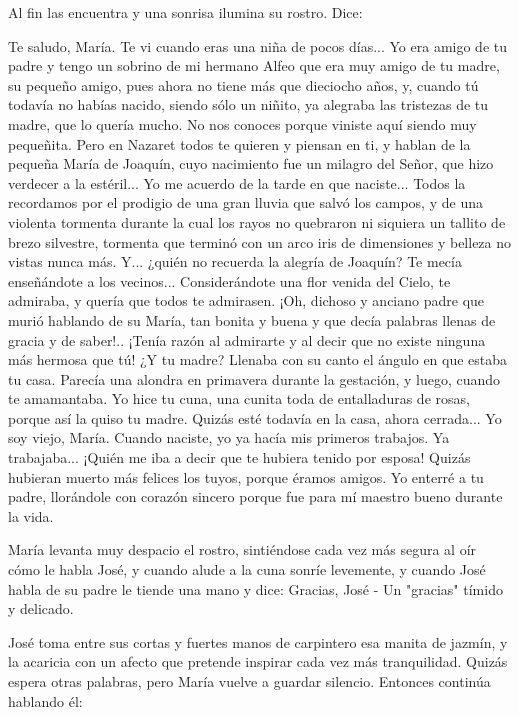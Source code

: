 \documentclass[12pt, twoside, openright]{book} %
\begin{document}
Al fin las encuentra y una sonrisa ilumina su rostro. Dice: 

Te saludo, María. Te vi cuando eras una niña de pocos días... Yo era amigo de tu padre y tengo un sobrino de mi hermano Alfeo que era muy amigo de tu madre, su pequeño amigo, pues ahora no tiene más que dieciocho años, y, cuando tú todavía no habías nacido, siendo sólo un niñito, ya alegraba las tristezas de tu madre, que lo quería mucho. No nos conoces porque viniste aquí siendo muy pequeñita. Pero en Nazaret todos te quieren y piensan en ti, y hablan de la pequeña María de Joaquín, cuyo nacimiento fue un milagro del Señor, que hizo verdecer a la estéril... Yo me acuerdo de la tarde en que naciste... Todos la recordamos por el prodigio de una gran lluvia que salvó los campos, y de una violenta tormenta durante la cual los rayos no quebraron ni siquiera un tallito de brezo silvestre, tormenta que terminó con un arco iris de dimensiones y belleza no vistas nunca más. Y... ¿quién no recuerda la alegría de Joaquín? Te mecía enseñándote a los vecinos... Considerándote una flor venida del Cielo, te admiraba, y quería que todos te admirasen. ¡Oh, dichoso y anciano padre que murió hablando de su María, tan bonita y buena y que decía palabras llenas de gracia y de saber!.. ¡Tenía razón al admirarte y al decir que no existe ninguna más hermosa que tú! ¿Y tu madre? Llenaba con su canto el ángulo en que estaba tu casa. Parecía una alondra en primavera durante la gestación, y luego, cuando te amamantaba. Yo hice tu cuna, una cunita toda de entalladuras de rosas, porque así la quiso tu madre. Quizás esté todavía en la casa, ahora cerrada... Yo soy viejo, María. Cuando naciste, yo ya hacía mis primeros trabajos. Ya trabajaba... ¡Quién me iba a decir que te hubiera tenido por esposa! Quizás hubieran muerto más felices los tuyos, porque éramos amigos. Yo enterré a tu padre, llorándole con corazón sincero porque fue para mí maestro bueno durante la vida. 

María levanta muy despacio el rostro, sintiéndose cada vez más segura al oír cómo le habla José, y cuando alude a la cuna sonríe levemente, y cuando José habla de su padre le tiende una mano y dice: Gracias, José - Un "gracias" tímido y delicado. 

José toma entre sus cortas y fuertes manos de carpintero esa manita de jazmín, y la acaricia con un afecto que pretende inspirar cada vez más tranquilidad. Quizás espera otras palabras, pero María vuelve a guardar silencio. Entonces continúa hablando él: 
\end{document}
